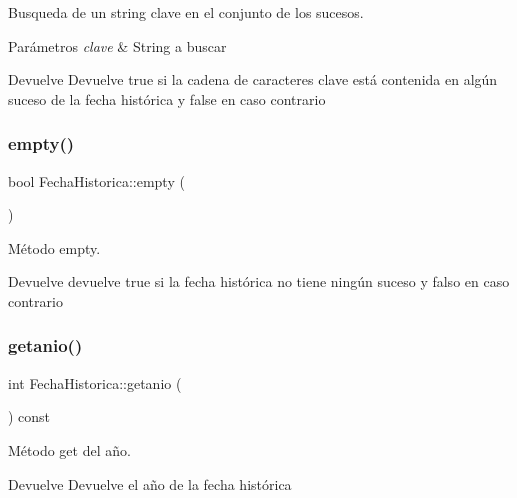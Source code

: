 Busqueda de un string clave en el conjunto de los sucesos. 


\begin{DoxyParams}{Parámetros}
{\em clave} & String a buscar \\
\hline
\end{DoxyParams}
\begin{DoxyReturn}{Devuelve}
Devuelve true si la cadena de caracteres clave está contenida en algún suceso de la fecha histórica y false en caso contrario 
\end{DoxyReturn}
\mbox{\label{classFechaHistorica_a4376f1b3e2b6578bf28cfdfe48808c25}} 
\subsubsection{\texorpdfstring{empty()}{empty()}}
{\footnotesize\ttfamily bool Fecha\+Historica\+::empty (\begin{DoxyParamCaption}{ }\end{DoxyParamCaption})}



Método empty. 

\begin{DoxyReturn}{Devuelve}
devuelve true si la fecha histórica no tiene ningún suceso y falso en caso contrario 
\end{DoxyReturn}
\mbox{\label{classFechaHistorica_a654f1222c7ed4f033219a801a9c7d6a8}} 
\subsubsection{\texorpdfstring{getanio()}{getanio()}}
{\footnotesize\ttfamily int Fecha\+Historica\+::getanio (\begin{DoxyParamCaption}{ }\end{DoxyParamCaption}) const}



Método get del año. 

\begin{DoxyReturn}{Devuelve}
Devuelve el año de la fecha histórica 
\end{DoxyReturn}
\mbox{\label{classFechaHistorica_ab517ddfc3c58240112cb6181c5292809}} 
